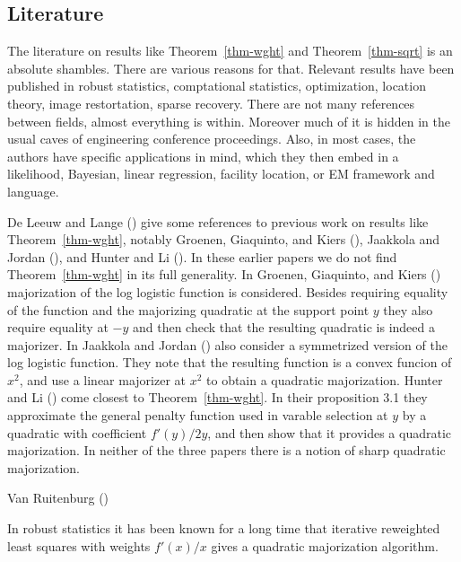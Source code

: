 \documentclass[
  12pt,
  letterpaper,
  DIV=11,
  numbers=noendperiod]{scrartcl}
\theoremstyle{plain}
\theoremstyle{plain}
\theoremstyle{plain}
\theoremstyle{definition}
\theoremstyle{remark}
\begin{document}
\subsection{Literature}\label{literature}

The literature on results like Theorem~\ref{thm-wght} and
Theorem~\ref{thm-sqrt} is an absolute shambles. There are various
reasons for that. Relevant results have been published in robust
statistics, comptational statistics, optimization, location theory,
image restortation, sparse recovery. There are not many references
between fields, almost everything is within. Moreover much of it is
hidden in the usual caves of engineering conference proceedings. Also,
in most cases, the authors have specific applications in mind, which
they then embed in a likelihood, Bayesian, linear regression, facility
location, or EM framework and language.

De Leeuw and Lange () give some
references to previous work on results like Theorem~\ref{thm-wght},
notably Groenen, Giaquinto, and Kiers
(), Jaakkola and Jordan
(), and Hunter and Li
(). In these earlier papers we do not
find Theorem~\ref{thm-wght} in its full generality. In Groenen,
Giaquinto, and Kiers ()
majorization of the log logistic function is considered. Besides
requiring equality of the function and the majorizing quadratic at the
support point \(y\) they also require equality at \(-y\) and then check
that the resulting quadratic is indeed a majorizer. In Jaakkola and
Jordan () also consider a
symmetrized version of the log logistic function. They note that the
resulting function is a convex funcion of \(x^2\), and use a linear
majorizer at \(x^2\) to obtain a quadratic majorization. Hunter and Li
() come closest to
Theorem~\ref{thm-wght}. In their proposition 3.1 they approximate the
general penalty function used in varable selection at \(y\) by a
quadratic with coefficient \(f'(y)/2y\), and then show that it provides
a quadratic majorization. In neither of the three papers there is a
notion of sharp quadratic majorization.

Van Ruitenburg ()

In robust statistics it has been known for a long time that iterative
reweighted least squares with weights \(f'(x)/x\) gives a quadratic
majorization algorithm.
\end{document}
